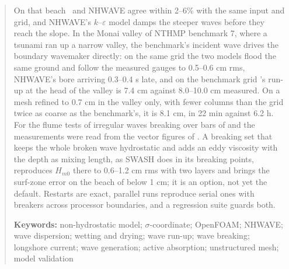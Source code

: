 \begin{abstract}
On that beach \NHFOAM\ and NHWAVE agree within 2--6\% with the same input
and grid, and NHWAVE's $k$--$\varepsilon$ model damps the steeper waves
before they reach the slope. In the Monai valley of NTHMP benchmark 7, where
a tsunami ran up a narrow valley, the benchmark's incident wave drives the
boundary wavemaker directly: on the same grid the two models flood the same
ground and follow the measured gauges to 0.5--0.6 cm rms, NHWAVE's bore
arriving 0.3--0.4 s late, and on the benchmark grid \NHFOAM's run-up at the
head of the valley is 7.4 cm against 8.0--10.0 cm measured. On a mesh refined
to 0.7 cm in the valley only, with fewer columns than the grid twice as
coarse as the benchmark's, it is 8.1 cm, in 22 min against 6.2 h.
For the flume tests of irregular waves breaking over bars of
\citet{battjes1978} and \citet{boers1996} the measurements were read from
the vector figures of \citet{zijlema2011}. A breaking set that keeps the
whole broken wave hydrostatic and adds an eddy viscosity with the depth as
mixing length, as SWASH does in its breaking points, reproduces $H_{m0}$
there to 0.6--1.2 cm rms with two layers and brings the surf-zone error on
the beach of \citet{ting1994} below 1 cm; it is an option, not yet the
default.
Restarts are
exact, parallel runs reproduce serial ones with breakers across processor
boundaries, and a regression suite guards both.

\vspace{0.5em}
\noindent\textbf{Keywords:} non-hydrostatic model; $\sigma$-coordinate;
OpenFOAM; NHWAVE; wave dispersion; wetting and drying; wave run-up;
wave breaking; longshore current; wave generation; active absorption;
unstructured mesh; model validation
\end{abstract}
